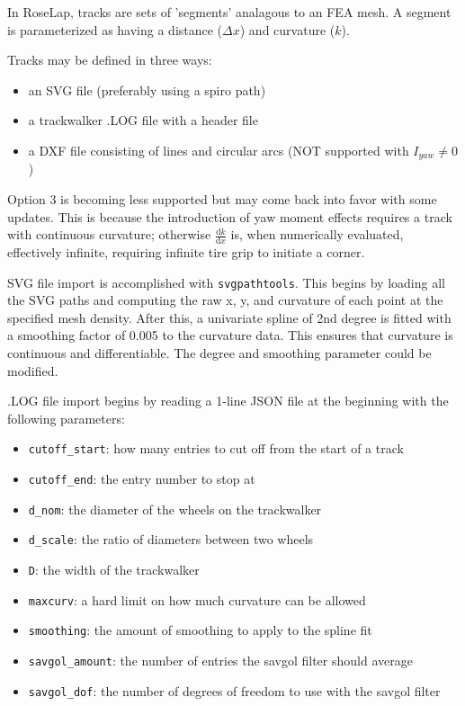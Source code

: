 \documentclass{article}
\def\D{\mathrm{d}}
\begin{document}
In RoseLap, tracks are sets of 'segments' analagous to an FEA mesh. A segment is parameterized as having a distance ($\Delta x$) and curvature ($k$).

Tracks may be defined in three ways:
\begin{itemize}
\item an SVG file (preferably using a spiro path)
\item a trackwalker .LOG file with a header file
\item a DXF file consisting of lines and circular arcs (NOT supported with $I_{yaw} \neq 0$)
\end{itemize}

Option 3 is becoming less supported but may come back into favor with some updates. This is because the introduction of yaw moment effects requires a track with continuous curvature; otherwise $\frac{\D k}{\D x}$ is, when numerically evaluated, effectively infinite, requiring infinite tire grip to initiate a corner.

SVG file import is accomplished with \texttt{svgpathtools}. This begins by loading all the SVG paths and computing the raw x, y, and curvature of each point at the specified mesh density. After this, a univariate spline of 2nd degree is fitted with a smoothing factor of 0.005 to the curvature data. This ensures that curvature is continuous and differentiable. The degree and smoothing parameter could be modified.

.LOG file import begins by reading a 1-line JSON file at the beginning with the following parameters:
\begin{itemize}
\item \texttt{cutoff\_start}: how many entries to cut off from the start of a track
\item \texttt{cutoff\_end}: the entry number to stop at
\item \texttt{d\_nom}: the diameter of the wheels on the trackwalker
\item \texttt{d\_scale}: the ratio of diameters between two wheels
\item \texttt{D}: the width of the trackwalker
\item \texttt{maxcurv}: a hard limit on how much curvature can be allowed
\item \texttt{smoothing}: the amount of smoothing to apply to the spline fit
\item \texttt{savgol\_amount}: the number of entries the savgol filter should average
\item \texttt{savgol\_dof}: the number of degrees of freedom to use with the savgol filter
\end{itemize}
\end{document}
